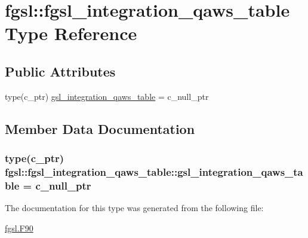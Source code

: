 \hypertarget{structfgsl_1_1fgsl__integration__qaws__table}{}\section{fgsl\+:\+:fgsl\+\_\+integration\+\_\+qaws\+\_\+table Type Reference}
\label{structfgsl_1_1fgsl__integration__qaws__table}
\subsection*{Public Attributes}
\begin{DoxyCompactItemize}
\item 
type(c\+\_\+ptr) \hyperlink{structfgsl_1_1fgsl__integration__qaws__table_af47cc732c480000d09979d48d978fd8e}{gsl\+\_\+integration\+\_\+qaws\+\_\+table} = c\+\_\+null\+\_\+ptr
\end{DoxyCompactItemize}


\subsection{Member Data Documentation}
\hypertarget{structfgsl_1_1fgsl__integration__qaws__table_af47cc732c480000d09979d48d978fd8e}{}
\subsubsection[{gsl\+\_\+integration\+\_\+qaws\+\_\+table}]{\setlength{\rightskip}{0pt plus 5cm}type(c\+\_\+ptr) fgsl\+::fgsl\+\_\+integration\+\_\+qaws\+\_\+table\+::gsl\+\_\+integration\+\_\+qaws\+\_\+table = c\+\_\+null\+\_\+ptr}\label{structfgsl_1_1fgsl__integration__qaws__table_af47cc732c480000d09979d48d978fd8e}


The documentation for this type was generated from the following file\+:\begin{DoxyCompactItemize}
\item 
\hyperlink{fgsl_8F90}{fgsl.\+F90}\end{DoxyCompactItemize}
